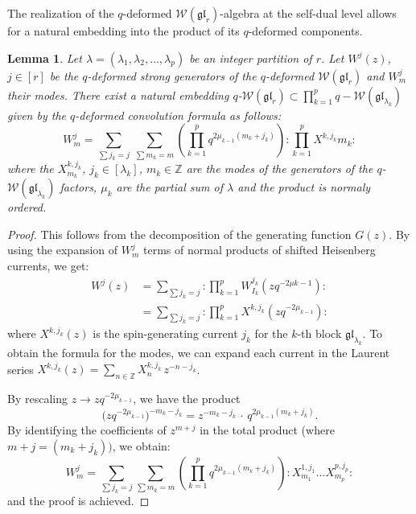 \documentclass[reqno,11pt]{amsart}
\theoremstyle{plain}
\newtheorem{lemma}[theorem]{Lemma}
\theoremstyle{definition}
\theoremstyle{remark}
\numberwithin{equation}{section}
\newcommand{\1}{\mathds{1}}
\newcommand{\2}{\frac{1}{2}}
\begin{document}
{				The realization of the $q$-deformed $\mathcal{W}(\mathfrak{gl}_r)$-algebra at the self-dual level allows for a natural embedding into the product of its $q$-deformed components.
				\begin{lemma}\label{l:embed}
					Let $\lambda = (\lambda_1, \lambda_2, \ldots, \lambda_p)$ be an integer partition of $r$.  Let $W^j(z)$, $j \in [r]$ be the $q$-deformed strong generators of the $q$-deformed  $\mathcal{W}(\mathfrak{gl}_r)$ and $W^j_m$ their modes. There exist  a natural embedding $q$-$\mathcal{W}(\mathfrak{gl}_r) \subset \prod_{k=1}^{p} q-\mathcal{W}(\mathfrak{gl}_{\lambda_k})$ given by the $q$-deformed convolution formula as follows:
					\begin{equation}\label{eq:embedding}
						W^j_m = \sum_{\sum j_k=j} \, \sum_{\sum m_k=m} \left( \prod_{k=1}^p q^{2\mu_{k-1}(m_k+j_k)} \right) : \prod_{k=1}^p X^{k,j_k}{m_k} :
					\end{equation}
					where the $X^{k,j_k}_{m_k}$, $j_k \in [\lambda_k]$, $m_k \in \mathbb{Z}$  are the modes of the  generators of the $q$-$\mathcal{W}(\mathfrak{gl}_{\lambda_k}) $ factors, $\mu_k$ are the partial sum of $\lambda$ and the product is normaly ordered. 
				\end{lemma}
				\begin{proof}
					This follows from the decomposition of the generating function $G(z)$. By using the expansion of $W^{j}_m$ terms of normal products of shifted Heisenberg currents, we get:
					\begin{align}
						W^j(z) &= \sum_{\sum j_k = j} : \prod_{k=1}^p W^{j_k}_{I_k}(z q^{-2\mu{k-1}}) : \nonumber\\
						&= \sum_{\sum j_k = j} : \prod_{k=1}^p X^{k,j_k}(z q^{-2\mu_{k-1}}) :
					\end{align}
					where $X^{k,j_k}(z)$ is the  spin-generating current $j_k$ for the $k$-th block $\mathfrak{gl}_{\lambda_k}$. To obtain the formula for the modes, we can expand each current in the Laurent series $X^{k,j_k}(z)=\sum_{n\in\mathbb{Z}}X^{k,j_k}_n\,z^{-n-j_k}$. 
					
					By rescaling $z\rightarrow zq^{-2\mu_{k-1}}$, we have the product
					\begin{equation}
						\bigg(zq^{-2\mu_{k-1}}\bigg)^{-m_{k}-j_{k}}=z^{-m_{k}-j_{k}}\, \cdot\, q^{2\mu_{k-1}(m_{k}+j_{k})}.
					\end{equation}
					By identifying the coefficients of $z^{m+j}$ in the total product (where $m+j=(m_k+j_k))$, we obtain:
					\begin{equation}
						W^j_m = \sum_{\sum j_k=j} \sum_{\sum m_k=m} \left( \prod_{k=1}^p q^{2\mu_{k-1}(m_k+j_k)} \right) : X^{1,j_1}_{m_1} \dots X^{p,j_p}_{m_p} :
					\end{equation}
					and the proof is achieved.
				\end{proof}
				
}
\end{document}
